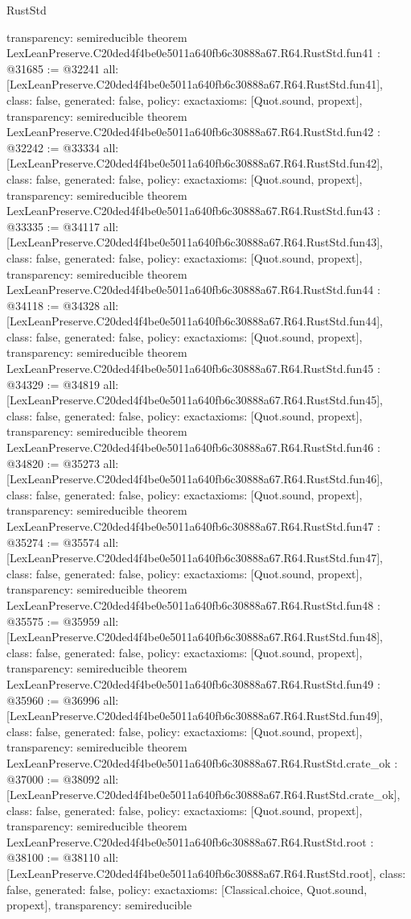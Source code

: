 \begin{lexlean}{RustStd}
\begin{coremodule}
{  transparency: semireducible
}
theorem LexLeanPreserve.C20ded4f4be0e5011a640fb6c30888a67.R64.RustStd.fun41 : @31685 := @32241 {
  all: [LexLeanPreserve.C20ded4f4be0e5011a640fb6c30888a67.R64.RustStd.fun41],
  class: false,
  generated: false,
  policy: exact{axioms: [Quot.sound, propext]},
  transparency: semireducible
}
theorem LexLeanPreserve.C20ded4f4be0e5011a640fb6c30888a67.R64.RustStd.fun42 : @32242 := @33334 {
  all: [LexLeanPreserve.C20ded4f4be0e5011a640fb6c30888a67.R64.RustStd.fun42],
  class: false,
  generated: false,
  policy: exact{axioms: [Quot.sound, propext]},
  transparency: semireducible
}
theorem LexLeanPreserve.C20ded4f4be0e5011a640fb6c30888a67.R64.RustStd.fun43 : @33335 := @34117 {
  all: [LexLeanPreserve.C20ded4f4be0e5011a640fb6c30888a67.R64.RustStd.fun43],
  class: false,
  generated: false,
  policy: exact{axioms: [Quot.sound, propext]},
  transparency: semireducible
}
theorem LexLeanPreserve.C20ded4f4be0e5011a640fb6c30888a67.R64.RustStd.fun44 : @34118 := @34328 {
  all: [LexLeanPreserve.C20ded4f4be0e5011a640fb6c30888a67.R64.RustStd.fun44],
  class: false,
  generated: false,
  policy: exact{axioms: [Quot.sound, propext]},
  transparency: semireducible
}
theorem LexLeanPreserve.C20ded4f4be0e5011a640fb6c30888a67.R64.RustStd.fun45 : @34329 := @34819 {
  all: [LexLeanPreserve.C20ded4f4be0e5011a640fb6c30888a67.R64.RustStd.fun45],
  class: false,
  generated: false,
  policy: exact{axioms: [Quot.sound, propext]},
  transparency: semireducible
}
theorem LexLeanPreserve.C20ded4f4be0e5011a640fb6c30888a67.R64.RustStd.fun46 : @34820 := @35273 {
  all: [LexLeanPreserve.C20ded4f4be0e5011a640fb6c30888a67.R64.RustStd.fun46],
  class: false,
  generated: false,
  policy: exact{axioms: [Quot.sound, propext]},
  transparency: semireducible
}
theorem LexLeanPreserve.C20ded4f4be0e5011a640fb6c30888a67.R64.RustStd.fun47 : @35274 := @35574 {
  all: [LexLeanPreserve.C20ded4f4be0e5011a640fb6c30888a67.R64.RustStd.fun47],
  class: false,
  generated: false,
  policy: exact{axioms: [Quot.sound, propext]},
  transparency: semireducible
}
theorem LexLeanPreserve.C20ded4f4be0e5011a640fb6c30888a67.R64.RustStd.fun48 : @35575 := @35959 {
  all: [LexLeanPreserve.C20ded4f4be0e5011a640fb6c30888a67.R64.RustStd.fun48],
  class: false,
  generated: false,
  policy: exact{axioms: [Quot.sound, propext]},
  transparency: semireducible
}
theorem LexLeanPreserve.C20ded4f4be0e5011a640fb6c30888a67.R64.RustStd.fun49 : @35960 := @36996 {
  all: [LexLeanPreserve.C20ded4f4be0e5011a640fb6c30888a67.R64.RustStd.fun49],
  class: false,
  generated: false,
  policy: exact{axioms: [Quot.sound, propext]},
  transparency: semireducible
}
theorem LexLeanPreserve.C20ded4f4be0e5011a640fb6c30888a67.R64.RustStd.crate_ok : @37000 := @38092 {
  all: [LexLeanPreserve.C20ded4f4be0e5011a640fb6c30888a67.R64.RustStd.crate_ok],
  class: false,
  generated: false,
  policy: exact{axioms: [Quot.sound, propext]},
  transparency: semireducible
}
theorem LexLeanPreserve.C20ded4f4be0e5011a640fb6c30888a67.R64.RustStd.root : @38100 := @38110 {
  all: [LexLeanPreserve.C20ded4f4be0e5011a640fb6c30888a67.R64.RustStd.root],
  class: false,
  generated: false,
  policy: exact{axioms: [Classical.choice, Quot.sound, propext]},
  transparency: semireducible
}


\end{coremodule}
\end{lexlean}
